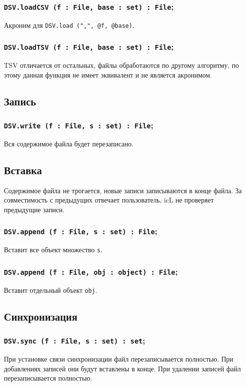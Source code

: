 \subsubsection{\texttt{DSV.loadCSV (f : File, base : set) : File};}

Акроним для \texttt{DSV.load (",", @f, @base)}.

\subsubsection{\texttt{DSV.loadTSV (f : File, base : set) : File};}

TSV отличается от остальных, файлы обработаются по другому алгоритму, по этому данная функция не имеет эквивалент и не является акронимом.

\subsection{Запись}

\subsubsection{\texttt{DSV.write (f : File, s : set) : File};}

Вся содержимое файла будет перезаписано.

\subsection{Вставка}

Содержимое файла не трогается, новые записи записываются в конце файла. За совместимость с предыдущих отвечает пользователь, icL не проверяет предыдущие записи.

\subsubsection{\texttt{DSV.append (f : File, s : set) : File};}

Вставит все объект множество \texttt{s}.

\subsubsection{\texttt{DSV.append (f : File, obj : object) : File};}

Вставит отдельный объект \texttt{obj}.

\subsection{Синхронизация}

\subsubsection{\texttt{DSV.sync (f : File, s : set) : set};}

При установке связи синхронизации файл перезаписывается полностью. При добавлениях записей они будут вставлены в конце. При удалении записей файл перезаписывается полностью.

